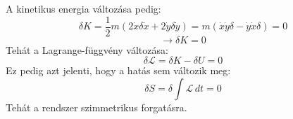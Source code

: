 \documentclass[a4paper,12pt]{article}
\begin{document}
A kinetikus energia változása pedig:
\begin{equation}
    \delta K = \frac{1}{2}m(2\dot{x} \delta \dot{x} + 2\dot{y} \delta \dot{y}) = m(\dot{x} \dot{y} \delta - \dot{y} \dot{x} \delta) = 0
\end{equation}
\begin{equation}
    \rightarrow \delta K = 0
\end{equation}
Tehát a Lagrange-függvény változása:
\begin{equation}
    \delta \mathcal{L} = \delta K - \delta U = 0
\end{equation}
Ez pedig azt jelenti, hogy a hatás sem változik meg:
\begin{equation}
    \delta S = \delta \int \mathcal{L} \, dt = 0
\end{equation}
Tehát a rendszer szimmetrikus forgatásra.
\end{document}
